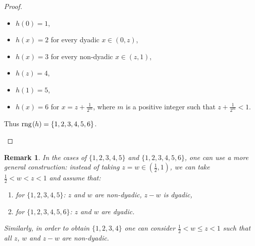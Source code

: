 \documentclass{amsart}
\newtheorem{remark}[theorem]{Remark}
\theoremstyle{definition}
\newtheorem{example}[theorem]{Example}
\newcommand{\rng}{{\rm rng} \hspace{0.03cm}}
\begin{document}
\begin{proof}
\begin{enumerate}
\begin{itemize}
		\item $h(0)=1$,
		\item $h(x)=2$ for every dyadic $x\in (0,z)$,
		\item $h(x)=3$ for every non-dyadic $x\in (z,1)$, 
		\item $h(z)=4$,
		\item $h(1)=5$,
		\item $h(x)=6$ for $x=z+\frac{1}{2^{m}}$, where $m$ is a positive integer such that $z+\frac{1}{2^{m}} < 1$.
	\end{itemize}
	Thus $\rng (h) = \{1,2,3,4,5,6\}$.
\end{enumerate}
\end{proof}



\begin{remark}\label{RemarkIntFilSetsConstructions}
In the cases of $\{1,2,3,4,5\}$ and $\{1,2,3,4,5,6\}$, one can use a more general construction: instead of taking $z=w\in (\frac{1}{2},1)$, we can take $\frac{1}{2}<w<z<1$ and assume that:
\begin{enumerate}
	\item for $\{1,2,3,4,5\}$: $z$ and $w$ are non-dyadic, $z-w$ is dyadic,
	\item for $\{1,2,3,4,5,6\}$: $z$ and $w$ are dyadic.
\end{enumerate}

Similarly, in order to obtain $\{1,2,3,4\}$ one can consider $\frac{1}{2}< w\leq z <1$ such that all $z$, $w$ and $z-w$ are non-dyadic. 
\end{remark}

\bigskip


\end{document}
